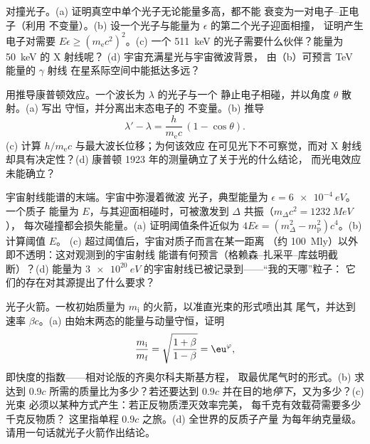 \begin{exercise}[$\star\star$]\label{exo:b3:relativistic-dynamics:9}
对撞光子。(a) 证明真空中单个光子无论能量多高，都不能
衰变为一对电子–正电子（利用
不变量）。(b) 设一个光子与能量为 $\epsilon$ 的第二个光子迎面相撞，
证明产生电子对需要 $E\epsilon \ge (m_{\text{e}}c^2)^2$。(c) 一个
\qty{511}{keV} 的光子需要什么伙伴？能量为 \qty{50}{keV} 的 X 射线呢？
(d) 宇宙充满星光与宇宙微波背景，
由（b）可预言 TeV 能量的 $\gamma$ 射线
在星系际空间中能抵达多远？
\end{exercise}

\begin{exercise}[$\star\star\star$]\label{exo:b3:relativistic-dynamics:10}
用推导康普顿效应。一个波长为 $\lambda$ 的光子与一个
静止电子相碰，并以角度 $\theta$ 散射。(a) 写出
守恒，并分离出末态电子的
不变量。(b) 推导
\[
\lambda' - \lambda = \frac{h}{m_{\text{e}}c}\,(1 - \cos\theta) .
\]
(c) 计算 $h/m_{\text{e}}c$ 与最大波长位移；为何该效应
在可见光下不可察觉，而对 X 射线却具有决定性？(d)
康普顿 1923 年的测量确立了关于光的什么结论，
而光电效应未能确立？
\end{exercise}

\begin{exercise}[$\star\star\star$]\label{exo:b3:relativistic-dynamics:11}
宇宙射线能谱的末端。宇宙中弥漫着微波
光子，典型能量为 $\epsilon = \qty{6e-4}{eV}$。一个质子
能量为 $E$，与其迎面相碰时，可被激发到
$\Delta$ 共振（$m_\Delta c^2 = \qty{1232}{MeV}$），
每次碰撞都会损失能量。(a) 证明阈值条件近似为 $4E\epsilon =
(m_\Delta^2 - m_{\text{p}}^2)c^4$。(b) 计算阈值 $E$。
(c) 超过阈值后，宇宙对质子而言在某一距离
（约 \qty{100}{Mly}）以外即不透明：这对观测到的宇宙射线
能谱有何预言（格赖森–扎采平–库兹明截断）？(d) 能量为
$\qty{3e20}{eV}$ 的宇宙射线已被记录到——“我的天哪”粒子：
它们的存在对其源提出了什么要求？
\end{exercise}

\begin{exercise}[$\star\star\star$]\label{exo:b3:relativistic-dynamics:12}
光子火箭。一枚初始质量为 $m_{\text{i}}$ 的火箭，以准直光束的形式喷出其
尾气，并达到速率 $\beta c$。(a)
由始末两态的能量与动量守恒，证明
\[
\frac{m_{\text{i}}}{m_{\text{f}}} =
\sqrt{\frac{1 + \beta}{1 - \beta}} = \eu^{\varphi} ,
\]
即快度的指数——相对论版的齐奥尔科夫斯基方程，
取最优尾气时的形式。(b) 求
达到 $0.9c$ 所需的质量比为多少？若还要达到 $0.9c$ 并在目的地\emph{停下}，又为多少？(c) 光束
必须以某种方式产生：若正反物质湮灭效率完美，
每千克有效载荷需要多少千克反物质？
这里指单程 $0.9c$ 之旅。(d) 全世界的反质子产量
为每年纳克量级。请用一句话就光子火箭作出结论。
\end{exercise}

